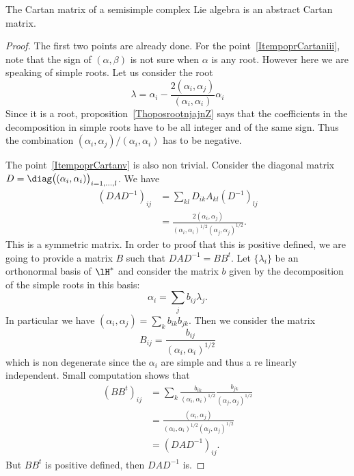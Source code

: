 \begin{proposition}
	The Cartan matrix of a semisimple complex Lie algebra is an abstract Cartan matrix.
\end{proposition}

\begin{proof}
	The first two points are already done. For the point~\ref{ItempoprCartaniii}, note that the sign of \( (\alpha,\beta)\) is not sure when \( \alpha\) is any root. However here we are speaking of simple roots. Let us consider the root
	\begin{equation}
		\lambda=\alpha_i-\frac{ 2(\alpha_i,\alpha_j) }{ (\alpha_i,\alpha_i) }\alpha_i
	\end{equation}
	Since it is a root, proposition~\ref{ThoposrootnjajnZ} says that the coefficients in the decomposition in simple roots have to be all integer and of the same sign. Thus the combination \( (\alpha_i,\alpha_j)/(\alpha_i,\alpha_i)\) has to be negative.

	The point~\ref{ItempoprCartanv} is also non trivial. Consider the diagonal matrix \( D=\diag\big( (\alpha_i,\alpha_i) \big)_{i=1,\ldots,l}\). We have
	\begin{subequations}
		\begin{align}
			(DAD^{-1})_{ij} & =\sum_{kl}D_{ik}A_{kl}(D^{-1})_{lj}                                                   \\
			                & =\frac{ 2(\alpha_i,\alpha_j) }{ (\alpha_i,\alpha_i)^{1/2}(\alpha_j,\alpha_j)^{1/2} }.
		\end{align}
	\end{subequations}
	This is a symmetric matrix. In order to proof that this is positive defined, we are going to provide a matrix \( B\) such that \( DAD^{-1}=BB^t\). Let \( \{ \lambda_i \}\) be an orthonormal basis of \( \lH^*\) and consider the matrix \( b\) given by the decomposition of the simple roots in this basis:
	\begin{equation}
		\alpha_i=\sum_j b_{ij}\lambda_j.
	\end{equation}
	In particular we have \( (\alpha_i,\alpha_j)=\sum_kb_{ik}b_{jk}\). Then we consider the matrix
	\begin{equation}
		B_{ij}=\frac{ b_{ij} }{ (\alpha_i,\alpha_i)^{1/2} }
	\end{equation}
	which is non degenerate since the \( \alpha_i\) are simple and thus a re linearly independent. Small computation shows that
	\begin{subequations}
		\begin{align}
			(BB^t)_{ij} & =\sum_k\frac{ b_{ik} }{ (\alpha_i,\alpha_i)^{1/2} }\frac{ b_{jk} }{ (\alpha_j,\alpha_j)^{1/2} } \\
			            & =\frac{ (\alpha_i,\alpha_j) }{ (\alpha_i,\alpha_i)^{1/2}(\alpha_j,\alpha_j)^{1/2} }             \\
			            & =(DAD^{-1})_{ij}.
		\end{align}
	\end{subequations}
	But \( BB^t\) is positive defined, then \( DAD^{-1}\) is.
\end{proof}


